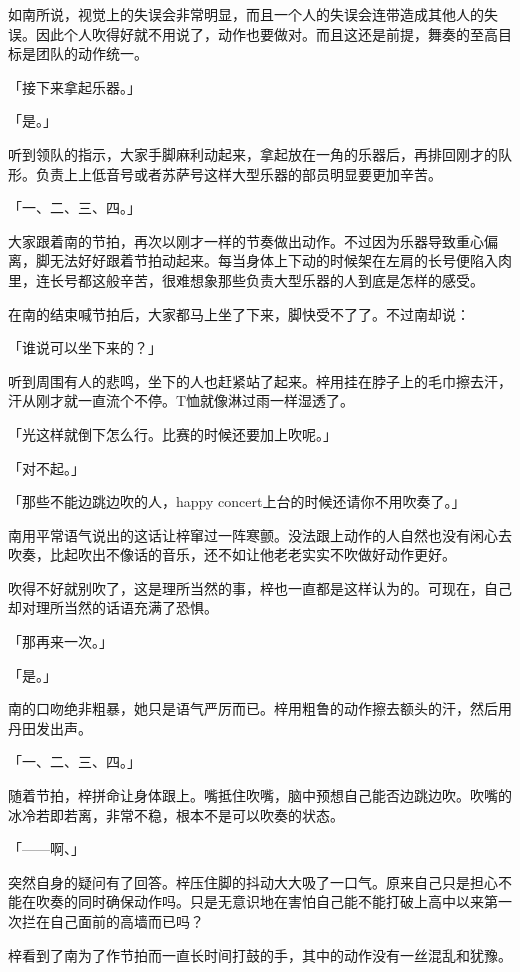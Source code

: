 \documentclass[UTF8]{ctexart}
\begin{document}
    如南所说，视觉上的失误会非常明显，而且一个人的失误会连带造成其他人的失误。因此个人吹得好就不用说了，动作也要做对。而且这还是前提，舞奏的至高目标是团队的动作统一。

    「接下来拿起乐器。」

    「是。」

    听到领队的指示，大家手脚麻利动起来，拿起放在一角的乐器后，再排回刚才的队形。负责上上低音号或者苏萨号这样大型乐器的部员明显要更加辛苦。

    「一、二、三、四。」

    大家跟着南的节拍，再次以刚才一样的节奏做出动作。不过因为乐器导致重心偏离，脚无法好好跟着节拍动起来。每当身体上下动的时候架在左肩的长号便陷入肉里，连长号都这般辛苦，很难想象那些负责大型乐器的人到底是怎样的感受。

    在南的结束喊节拍后，大家都马上坐了下来，脚快受不了了。不过南却说：

    「谁说可以坐下来的？」

    听到周围有人的悲鸣，坐下的人也赶紧站了起来。梓用挂在脖子上的毛巾擦去汗，汗从刚才就一直流个不停。T恤就像淋过雨一样湿透了。

    「光这样就倒下怎么行。比赛的时候还要加上吹呢。」

    「对不起。」

    「那些不能边跳边吹的人，happy concert上台的时候还请你不用吹奏了。」

    南用平常语气说出的这话让梓窜过一阵寒颤。没法跟上动作的人自然也没有闲心去吹奏，比起吹出不像话的音乐，还不如让他老老实实不吹做好动作更好。

    吹得不好就别吹了，这是理所当然的事，梓也一直都是这样认为的。可现在，自己却对理所当然的话语充满了恐惧。

    「那再来一次。」

    「是。」

    南的口吻绝非粗暴，她只是语气严厉而已。梓用粗鲁的动作擦去额头的汗，然后用丹田发出声。

    「一、二、三、四。」

    随着节拍，梓拼命让身体跟上。嘴抵住吹嘴，脑中预想自己能否边跳边吹。吹嘴的冰冷若即若离，非常不稳，根本不是可以吹奏的状态。

    「——啊、」

    突然自身的疑问有了回答。梓压住脚的抖动大大吸了一口气。原来自己只是担心不能在吹奏的同时确保动作吗。只是无意识地在害怕自己能不能打破上高中以来第一次拦在自己面前的高墙而已吗？

    梓看到了南为了作节拍而一直长时间打鼓的手，其中的动作没有一丝混乱和犹豫。
\end{document}
